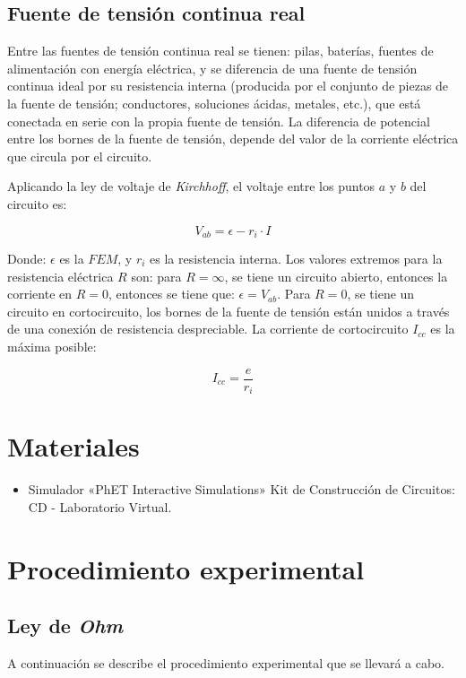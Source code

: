 \documentclass[letter,11pt]{article}
\begin{document}
\subsection{Fuente de tensión continua real}
Entre las fuentes de tensión continua real se tienen: pilas, baterías, fuentes
de alimentación con energía eléctrica, y se diferencia de una fuente de tensión
continua ideal por su resistencia interna (producida por el conjunto de piezas
de la fuente de tensión; conductores, soluciones ácidas, metales, etc.), que
está conectada en serie con la propia fuente de tensión. La diferencia de
potencial entre los bornes de la fuente de tensión, depende del valor de la
corriente eléctrica que circula por el circuito.

Aplicando la ley de voltaje de \emph{Kirchhoff}, el voltaje entre los puntos $a$
y $b$ del circuito es:

\begin{equation}
    V_{ab} = \epsilon - r_i \cdot I
\label{kirchhoff}
\end{equation}

Donde: $\epsilon$ es la $FEM$, y $r_i$ es la resistencia interna. Los valores
extremos para la resistencia eléctrica $R$ son: para $R = \infty$, se tiene un
circuito abierto, entonces la corriente en $R = 0$, entonces se tiene que:
$\epsilon = V_{ab}$. Para $R = 0$, se tiene un circuito en cortocircuito, los
bornes de la fuente de tensión están unidos a través de una conexión de
resistencia despreciable. La corriente de cortocircuito $I_{cc}$ es la máxima
posible:

\begin{equation}
    I_{cc} = \frac{e}{r_i}
\label{icc}
\end{equation}

\section{Materiales}
\begin{itemize}
\item Simulador «PhET Interactive Simulations» Kit de Construcción de Circuitos:
CD - Laboratorio Virtual.
\end{itemize}

\section{Procedimiento experimental}

\subsection{Ley de \emph{Ohm}}
A continuación se describe el procedimiento experimental que se llevará a cabo.
\end{document}
